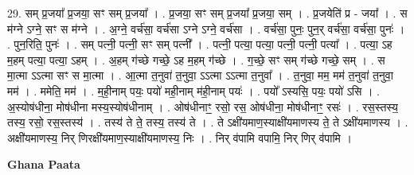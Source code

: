 \documentclass[17pt]{extarticle}
\begin{document}
29. सम् प्र॒जया᳚ प्र॒जया॒ सꣳ सम् प्र॒जया᳚ । . प्र॒जया॒ सꣳ सम् प्र॒जया᳚ प्र॒जया॒ सम् । . प्र॒जयेति॑ प्र - जया᳚ । . स म॑ग्ने ऽग्ने॒ सꣳ स म॑ग्ने । . अ॒ग्ने॒ वर्च॑सा॒ वर्च॑सा ऽग्ने ऽग्ने॒ वर्च॑सा । . वर्च॑सा॒ पुनः॒ पुन॒र् वर्च॑सा॒ वर्च॑सा॒ पुनः॑ । . पुन॒रिति॒ पुनः॑ । . सम् पत्नी॒ पत्नी॒ सꣳ सम् पत्नी᳚ । . पत्नी॒ पत्या॒ पत्या॒ पत्नी॒ पत्नी॒ पत्या᳚ । . पत्या॒ ऽह म॒हम् पत्या॒ पत्या॒ ऽहम् । . अ॒हम् ग॑च्छे गच्छे॒ ऽह म॒हम् ग॑च्छे । . ग॒च्छे॒ सꣳ सम् ग॑च्छे गच्छे॒ सम् । . स मा॒त्मा ऽऽत्मा सꣳ स मा॒त्मा । . आ॒त्मा त॒नुवा॑ त॒नुवा॒ ऽऽत्मा ऽऽत्मा त॒नुवा᳚ । . त॒नुवा॒ मम॒ मम॑ त॒नुवा॑ त॒नुवा॒ मम॑ । . ममेति॒ मम॑ । . म॒ही॒नाम् पयः॒ पयो॑ मही॒नाम् म॑ही॒नाम् पयः॑ । . पयो᳚ ऽस्यसि॒ पयः॒ पयो॑ ऽसि । . अ॒स्योष॑धीना॒ मोष॑धीना मस्य॒स्योष॑धीनाम् । . ओष॑धीनाꣳ॒॒ रसो॒ रस॒ ओष॑धीना॒ मोष॑धीनाꣳ॒॒ रसः॑ । . रस॒स्तस्य॒ तस्य॒ रसो॒ रस॒स्तस्य॑ । . तस्य॑ ते ते॒ तस्य॒ तस्य॑ ते । . ते ऽक्षी॑यमाण॒स्याक्षी॑यमाणस्य ते॒ ते ऽक्षी॑यमाणस्य । . अक्षी॑यमाणस्य॒ निर् णिरक्षी॑यमाण॒स्याक्षी॑यमाणस्य॒ निः । . निर् व॑पामि वपामि॒ निर् णिर् व॑पामि । \newline

\textbf{Ghana Paata } \newline
\end{document}
